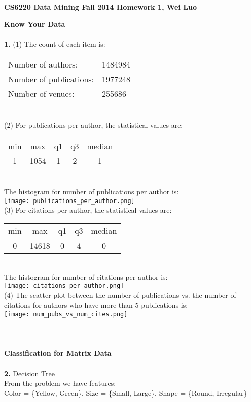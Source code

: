 \documentclass[11pt,a4paper,fleqn]{article}
\begin{document}
\begin{center}
\textbf{CS6220 Data Mining Fall 2014 Homework 1, Wei Luo}\\
\end{center}
\textbf{Know Your Data}\\ \\
\textbf{1.} (1) The count of each item is:\\
\begin{tabular}{ll} 
Number of authors: &1484984\\
Number of publications: &1977248\\
Number of venues: &255686\\
\end{tabular}\\
(2) For publications per author, the statistical values are:\\
\begin{tabular}{ccccc} 
min&max&q1&q3&median\\
1&1054&1&2&1\\
\end{tabular}\\
The histogram for number of publications per author is:\\
\texttt{[image: publications\_per\_author.png]}\\
(3) For citations per author, the statistical values are:\\
\begin{tabular}{ccccc} 
min&max&q1&q3&median\\
0&14618&0&4&0\\
\end{tabular}\\
The histogram for number of citations per author is:\\
\texttt{[image: citations\_per\_author.png]}\\
(4) The scatter plot between the number of publications vs. the number of citations for authors who have more than 5 publications is:\\
\texttt{[image: num\_pubs\_vs\_num\_cites.png]}\\
\\ \\ \\
\textbf{Classification for Matrix Data}\\ \\
\textbf{2.} Decision Tree\\
From the problem we have features:\\
Color = \{Yellow, Green\}, Size = \{Small, Large\}, Shape = \{Round, Irregular\}\\
\end{document}
